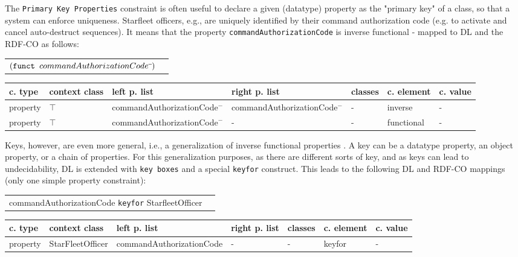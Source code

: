\documentclass{llncs}
\newcommand{\ms}[1]{\texttt{#1}}
\newenvironment{gcotable}{
  \scriptsize
  \sffamily
  \vspace{0cm}
	\begin{center}
  \begin{tabular}{l|l|l|l|l|l|l}
  \hline
  \textbf{c. type} & \textbf{context class} & \textbf{left p. list} & \textbf{right p. list} & \textbf{classes} & \textbf{c. element} & \textbf{c. value} \\
  \hline

}{
  \hline
  \end{tabular}
	\end{center}
}
\newenvironment{DL}{
  \vspace{0cm}
	\begin{center}
  \begin{tabular}{r l}

}{
  \end{tabular}
	\end{center}
}
\begin{document}
The \ms{Primary Key Properties} constraint is often useful to declare a given (datatype) property as the "primary key" of a class, so that a system can enforce uniqueness. 
Starfleet officers, e.g., are uniquely identified by their command authorization code (e.g. to activate and cancel auto-destruct sequences).
It means that the property \ms{commandAuthorizationCode} is inverse functional - mapped to DL and the RDF-CO as follows:

\begin{DL}
$(\ms{funct } commandAuthorizationCode\sp{\overline{\ }})$
\end{DL}

\begin{gcotable}
property & $\top$ & commandAuthorizationCode$^{-}$ & commandAuthorizationCode$^{-}$ & - & inverse & - \\
property & $\top$ & commandAuthorizationCode$^{-}$ & - & - & functional & - \\
\end{gcotable}

Keys, however, are even more general, i.e., a generalization of inverse functional properties \cite{Schneider2009}.
A key can be a datatype property, an object property, or a chain of properties.
For this generalization purposes, as there are different sorts of key, and as keys can lead to undecidability, 
DL is extended with \ms{key boxes} and a special \ms{keyfor} construct\cite{Lutz2005}.
This leads to the following DL and RDF-CO mappings (only one simple property constraint):

\begin{DL}
commandAuthorizationCode \ms{keyfor} StarfleetOfficer
\end{DL}

\begin{gcotable}
property & StarFleetOfficer & commandAuthorizationCode & - & - & keyfor & - \\
\end{gcotable}

\end{document}
